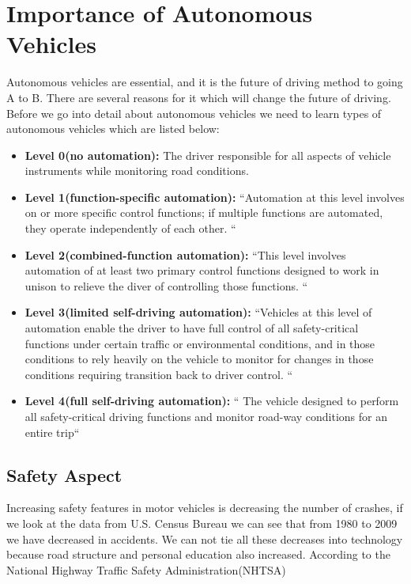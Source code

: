 \documentclass{acmart}
\begin{document}
\section{Importance of Autonomous Vehicles}

Autonomous vehicles are essential, and it is the future of driving method to going A to B. There are several reasons for it which will change the future of driving. Before we go into detail about autonomous vehicles we need to learn types of autonomous vehicles which are listed below: 

\begin{itemize}
    \item \textbf{Level 0(no automation):} The driver responsible for all aspects of vehicle instruments while monitoring road conditions.\cite{hamzah}
    \item \textbf{Level 1(function-specific automation):} ``Automation at this level involves on or more specific control functions; if multiple functions are automated, they operate independently of each other. ``\cite{hamzah}
    \item \textbf{Level 2(combined-function automation):} ``This level involves automation of at least two primary control functions designed to work in unison to relieve the diver of controlling those functions. ``\cite{hamzah}
    \item \textbf{Level 3(limited self-driving automation):} ``Vehicles at this level of automation enable the driver to have full control of all safety-critical functions under certain traffic or environmental conditions, and in those conditions to rely heavily on the vehicle to monitor for changes in those conditions requiring transition back to driver control. ``\cite{hamzah}
    \item \textbf{Level 4(full self-driving automation):} `` The vehicle designed to perform all safety-critical driving functions and monitor road-way conditions for an entire trip``\cite{hamzah}
\end{itemize}

\subsection{Safety Aspect}
Increasing safety features in motor vehicles is decreasing the number of crashes, if we look at the data from U.S. Census Bureau we can see that from 1980 to 2009 we have decreased in accidents. We can not tie all these decreases into technology because road structure and personal education also increased. According to the National Highway Traffic Safety Administration(NHTSA)
 
\end{document}
